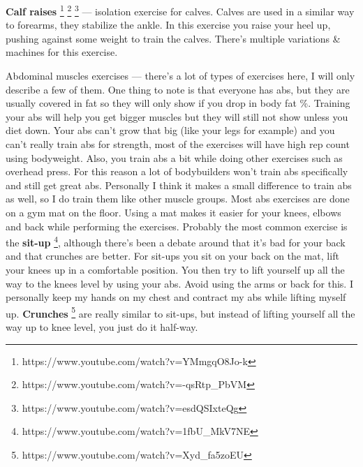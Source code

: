 \documentclass[openany, 12pt]{book}
\begin{document}
        \textbf{Calf raises}
        \footnote{https://www.youtube.com/watch?v=YMmgqO8Jo-k}
        \footnote{https://www.youtube.com/watch?v=-qsRtp\_PbVM}
        \footnote{https://www.youtube.com/watch?v=esdQSIxteQg}
        ---
        isolation exercise for calves. Calves are used in a similar way to forearms, they stabilize the ankle. In this exercise you raise your heel up, pushing against some weight to train the calves.
        There's multiple variations \& machines for this exercise.

        Abdominal muscles exercises
        ---
        there's a lot of types of exercises here, I will only describe a few of them. One thing to note is that everyone has abs, but they are usually covered in fat so they will only show if you drop
        in body fat \%. Training your abs will help you get bigger muscles but they will still not show unless you diet down.
        Your abs can't grow that big (like your legs for example) and you can't really train abs for strength, most of the exercises will have high rep count using bodyweight.
        Also, you train abs a bit while doing other exercises such as overhead press. For this reason a lot of bodybuilders won't train abs specifically and still get great abs.
        Personally I think it makes a small difference to train abs as well, so I do train them like other muscle groups.
        Most abs exercises are done on a gym mat on the floor. Using a mat makes it easier for your knees, elbows and back while performing the exercises.
        Probably the most common exercise is the \textbf{sit-up}
        \footnote{https://www.youtube.com/watch?v=1fbU\_MkV7NE}, although there's been a debate around that it's bad for your back and
        that crunches are better. For sit-ups you sit on your back on the mat, lift your knees up in a comfortable position.
        You then try to lift yourself up all the way to the knees level by using your abs. Avoid using the arms or back for this. I personally keep my hands on my chest and contract my abs
        while lifting myself up.
        \textbf{Crunches}
        \footnote{https://www.youtube.com/watch?v=Xyd\_fa5zoEU}
        are really similar to sit-ups, but instead of lifting yourself all the way up to knee level, you just do it half-way.
        
\end{document}
